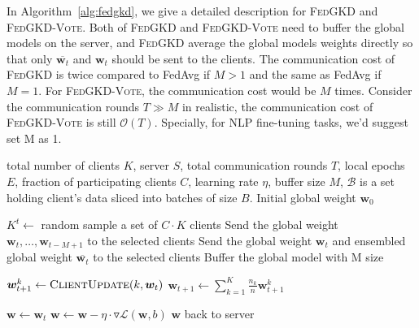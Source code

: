 \documentclass{article} %
\newcommand{\LS}{\mathcal{L}}
\newcommand{\w}{\boldsymbol{w}}
\newcommand{\system}{\textsc{FedGKD}\xspace}
\newcommand{\systemled}{\textsc{FedGKD-Vote}\xspace}
\begin{document}
In Algorithm~\ref{alg:fedgkd}, we give a detailed description for \system and \systemled. Both of \system and \systemled need to buffer the global models on the server, and \system average the global models weights directly so that only  $\overline{\w_t}$ and $\w_t$ should be sent to the clients. The communication cost of \system is twice compared to FedAvg if $M>1$ and the same as FedAvg if $M=1$. For \systemled, the communication cost would be $M$ times. Consider the communication rounds $T\gg M$ in realistic, the communication cost of \systemled is still $\mathcal{O}(T)$. Specially, for NLP fine-tuning tasks, we'd suggest set M as 1.

\begin{algorithm}[tb]
\begin{algorithmic}[1]
	 total number of clients $K$, server $S$, total communication rounds $T$, local epochs $E$, fraction of participating clients $C$, learning rate $\eta$, buffer size $M$, $\mathcal{B}$ is a set holding client’s data sliced into batches of size $B$. 
 	 
	    \State Initial global weight $\w_0$
	    
	        \State $K^t \leftarrow$ random sample a set of $C \cdot K$  clients
    	    \If{\systemled}
    	    \State Send the global weight $\w_t,\ldots,\w_{t-M+1}$ to the selected clients
    	    \Else
    	    \State Send the global weight $\w_t$ and ensembled global weight $\overline{\w_t}$ to the selected clients
    	    \EndIf
    	    \State Buffer the global model with M size
	    
	    \EndFor
		\State $\w_{t+1}^k \leftarrow 
		\textsc{ClientUpdate}(k, \w_t)$
		\State $\w_{t+1} \leftarrow \sum_{k=1}^K \frac{n_k}{n}\w_{t+1}^k$
		\EndFor
 	\EndProcedure
	
	\Procedure{ClientUpdate}{$k, \w_t$}
	\State $\w \leftarrow \w_t$
		\State $\w \leftarrow \w - \eta \cdot \triangledown \LS(\w, b)$  
		\EndFor
	\EndFor
	 $\w$ back to server
	\EndProcedure
\end{algorithmic}
\caption{\system: Global Knowledge Distillation in Federated Learning}
\label{alg:fedgkd}
\end{algorithm}
\end{document}
